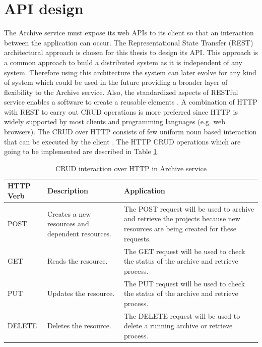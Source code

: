 \section{API design}
\label{section:APIDesign}
    The Archive service must expose its web APIs to its client so that an interaction between the application can occur.
    The Representational State Transfer (REST) \cite[Chapter.~5]{REST} architectural approach is chosen for this thesis
    to design its API. This approach is a 
    common approach to build a distributed system as it is independent of any system. Therefore using this architecture the system can later 
    evolve for any kind of system which could be used in the future providing a broader layer of flexibility to the Archive service. 
    Also, the standardized aspects of RESTful service enables a software to create a reusable elements \cite{RESTThesis}. A combination of HTTP with REST to carry out
    CRUD operations is more preferred since HTTP is widely supported by most clients and programming languages (e.g. web browsers).
    The CRUD over HTTP consists of few uniform noun based interaction that can be executed by the client \cite[p.~13]{RESTThesis}. The
    HTTP CRUD operations which are going to be implemented are described in Table \ref{table:curdHttp}.

    \begin{table}[h!]
        \centering
        \begin{tabular}{|p{2cm}|p{4cm}|p{7cm}|}
            \hline
                \textbf{HTTP Verb}  & \textbf{Description} & \textbf{Application}\\
            \hline
                POST & 
                Creates a new resources and dependent resources.
                & The POST request will be used to archive and retrieve the projects because new resources are being created for these requests.\\
            \hline
                GET & Reads the resource. & The GET request will be used to check the status of the archive and retrieve process. \\
            \hline
            PUT & Updates the resource. & The PUT request will be used to check the status of the archive and retrieve process. \\
            \hline
                DELETE & Deletes the resource. & The DELETE request will be used to delete a running archive or retrieve process. \\                
            \hline
        \end{tabular}
        \caption{CRUD interaction over HTTP in Archive service}
        \label{table:curdHttp}     
    \end{table}   
    
